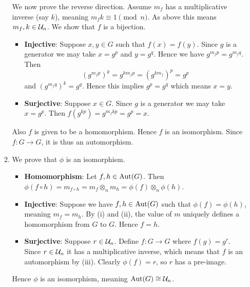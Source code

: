 \begin{enumerate}
\begin{enumerate}[label=(\roman*)]
        We now prove the reverse direction. Assume $m_f$ has a multiplicative inverse (say $k$), meaning $m_fk \equiv 1 \pmod n$. As above this means $m_f, k \in \mathcal{U}_{n}$. We show that $f$ is a bijection.
        \begin{itemize}
            \item \textbf{Injective}: Suppose $x, y \in G$ such that $f(x) = f(y)$. Since $g$ is a generator we may take $x = g^p$ and $y = g^q$. Hence we have $g^{m_fp} = g^{m_fq}$. Then
            \[
                \left(g^{m_fp}\right)^k = g^{km_fp} = \left(g^{km_f}\right)^p = g^p            
            \]
            and $\left(g^{m_fq}\right)^k = g^q$. Hence this implies $g^p = g^q$ which means $x = y$.
            \item \textbf{Surjective}: Suppose $x \in G$. Since $g$ is a generator we may take $x = g^p$. Then $f(g^{kp}) = g^{m_fkp} = g^p = x$.
        \end{itemize}
        Also $f$ is given to be a homomorphism. Hence $f$ is an isomorphism. Since $f: G \to G$, it is thus an automorphism.
        
        \item We prove that $\phi$ is an isomorphism.
        \begin{itemize}
            \item \textbf{Homomorphism}: Let $f, h \in \mathrm{Aut}(G)$. Then $\phi(f\circ h) = m_{f\circ h} = m_f \otimes_n m_h = \phi(f)\otimes_n\phi(h)$.
            \item \textbf{Injective}: Suppose we have $f, h \in \mathrm{Aut}(G)$ such that $\phi(f) = \phi(h)$, meaning $m_f = m_h$. By (i) and (ii), the value of $m$ uniquely defines a homomorphism from $G$ to $G$. Hence $f = h$.
            \item \textbf{Surjective}: Suppose $r \in \mathcal{U}_{n}$. Define $f: G \to G$ where $f(g) = g^r$. Since $r \in \mathcal{U}_{n}$ it has a multiplicative inverse, which means that $f$ is an automorphism by (iii). Clearly $\phi(f) = r$, so $r$ has a pre-image.
        \end{itemize}
        Hence $\phi$ is an isomorphism, meaning $\mathrm{Aut}(G) \cong \mathcal{U}_{n}$.
    \end{enumerate}
\end{enumerate}

